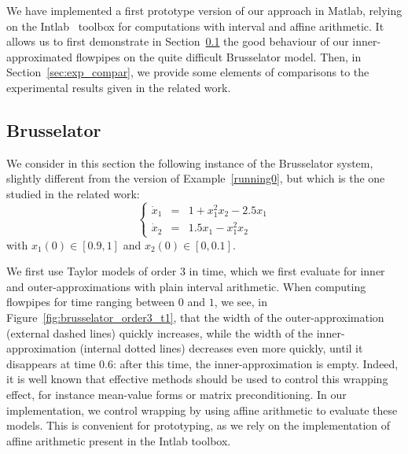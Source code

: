 We have implemented a first prototype version of our approach in Matlab, relying on the Intlab~\cite{Ru99a} 
toolbox for computations with interval and affine arithmetic.
It allows us to first demonstrate in Section~\ref{sec:exp_bruss} the good behaviour of our inner-approximated flowpipes
 on the quite difficult Brusselator model. %
Then, in Section~\ref{sec:exp_compar}, we provide some elements of comparisons to the experimental results 
given in the related work. 
 
\subsection{Brusselator}
\label{sec:exp_bruss}

We consider in this section the following instance of the Brusselator system, slightly different  from the version of  Example~\ref{running0}, but
which is the one studied in the related work:
$$\left\{\begin{array}{rcl}
\dot{x}_1 & = & 1+x_1^2x_2-2.5x_1 \\
\dot{x}_2 & = & 1.5x_1-x_1^2x_2
\end{array}\right.$$
\noindent with $x_1(0) \in [0.9,1]$ and $x_2(0) \in [0,0.1]$.

We first use Taylor models of order 3 in time, which we first evaluate for inner and outer-approximations 
with plain interval arithmetic. When computing flowpipes for time ranging between $0$ and $1$, 
we see, in Figure~\ref{fig:brusselator_order3_t1}, that the width of the outer-approximation 
(external dashed lines) quickly increases, while the 
width of the inner-approximation (internal dotted lines) decreases even more quickly, 
until it disappears at time 0.6: after this time, the inner-approximation is empty. Indeed, it is well 
known that effective methods should be used to control this wrapping effect, for instance mean-value 
forms or matrix preconditioning. In our implementation, we control wrapping by using 
affine arithmetic to evaluate these models. %
This is convenient for prototyping, 
as we rely on the implementation of affine arithmetic present in the Intlab 
toolbox.
 
